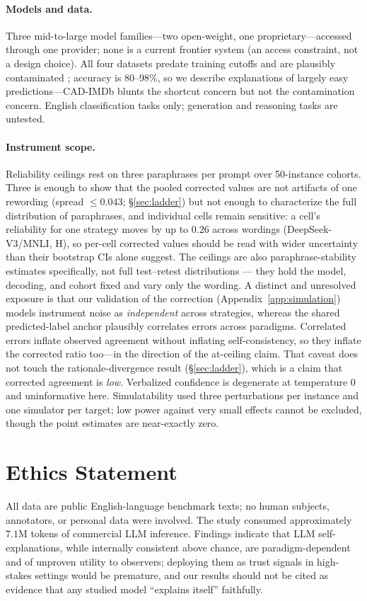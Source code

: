 \documentclass[11pt]{article}
\begin{document}
\paragraph{Models and data.} Three mid-to-large model families---two open-weight, one proprietary---accessed through one provider; none is a current frontier system (an access constraint, not a design choice). All four datasets predate training cutoffs and are plausibly contaminated \citep{sainz2023nlp}; accuracy is 80--98\%, so we describe explanations of largely easy predictions---CAD-IMDb blunts the shortcut concern but not the contamination concern. English classification tasks only; generation and reasoning tasks are untested.

\paragraph{Instrument scope.} Reliability ceilings rest on three paraphrases per prompt over 50-instance cohorts. Three is enough to show that the pooled corrected values are not artifacts of one rewording (spread $\le 0.043$; \S\ref{sec:ladder}) but not enough to characterize the full distribution of paraphrases, and individual cells remain sensitive: a cell's reliability for one strategy moves by up to $0.26$ across wordings (DeepSeek-V3/MNLI, H), so per-cell corrected values should be read with wider uncertainty than their bootstrap CIs alone suggest. The ceilings are also paraphrase-stability estimates specifically, not full test--retest distributions --- they hold the model, decoding, and cohort fixed and vary only the wording. A distinct and unresolved exposure is that our validation of the correction (Appendix~\ref{app:simulation}) models instrument noise as \emph{independent} across strategies, whereas the shared predicted-label anchor plausibly correlates errors across paradigms. Correlated errors inflate observed agreement without inflating self-consistency, so they inflate the corrected ratio too---in the direction of the at-ceiling claim. That caveat does not touch the rationale-divergence result (\S\ref{sec:ladder}), which is a claim that corrected agreement is \emph{low}. Verbalized confidence is degenerate at temperature 0 and uninformative here. Simulatability used three perturbations per instance and one simulator per target; low power against very small effects cannot be excluded, though the point estimates are near-exactly zero.

\section*{Ethics Statement}
All data are public English-language benchmark texts; no human subjects, annotators, or personal data were involved. The study consumed approximately $7.1$M tokens of commercial LLM inference. Findings indicate that LLM self-explanations, while internally consistent above chance, are paradigm-dependent and of unproven utility to observers; deploying them as trust signals in high-stakes settings would be premature, and our results should not be cited as evidence that any studied model ``explains itself'' faithfully.
\end{document}
